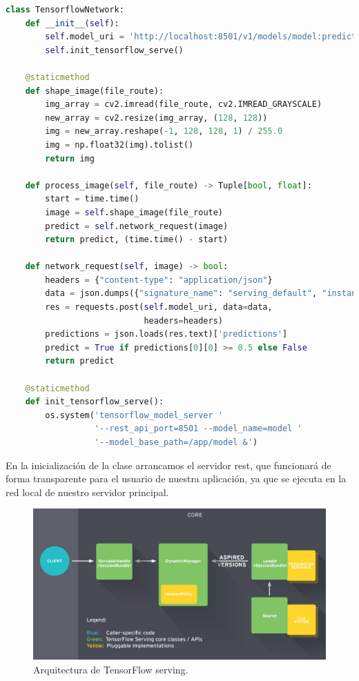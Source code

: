 \begin{lstlisting}[caption=Clase Python para la red de inferencia de TensorFlow.,
      label=b_label,
      language=Python,label={example2}]
class TensorflowNetwork:
    def __init__(self):
        self.model_uri = 'http://localhost:8501/v1/models/model:predict'
        self.init_tensorflow_serve()

    @staticmethod
    def shape_image(file_route):
        img_array = cv2.imread(file_route, cv2.IMREAD_GRAYSCALE)
        new_array = cv2.resize(img_array, (128, 128))
        img = new_array.reshape(-1, 128, 128, 1) / 255.0
        img = np.float32(img).tolist()
        return img

    def process_image(self, file_route) -> Tuple[bool, float]:
        start = time.time()
        image = self.shape_image(file_route)
        predict = self.network_request(image)
        return predict, (time.time() - start)

    def network_request(self, image) -> bool:
        headers = {"content-type": "application/json"}
        data = json.dumps({"signature_name": "serving_default", "instances": image})
        res = requests.post(self.model_uri, data=data,
                            headers=headers)
        predictions = json.loads(res.text)['predictions']
        predict = True if predictions[0][0] >= 0.5 else False
        return predict

    @staticmethod
    def init_tensorflow_serve():
        os.system('tensorflow_model_server '
                  '--rest_api_port=8501 --model_name=model '
                  '--model_base_path=/app/model &')
\end{lstlisting}

En la inicialización de la clase arrancamos el servidor rest, que funcionará de forma transparente para el usuario de nuestra aplicación, ya que se ejecuta en la red
local de nuestro servidor principal.


\begin{figure}[h]
    \centering
    \includegraphics[width=1.0\textwidth]{images/chapter3/tf_serving_architecture.png}
    \caption{Arquitectura de TensorFlow serving.}
    \label{fig:Arquitectura de TensorFlow serving}
\end{figure}

